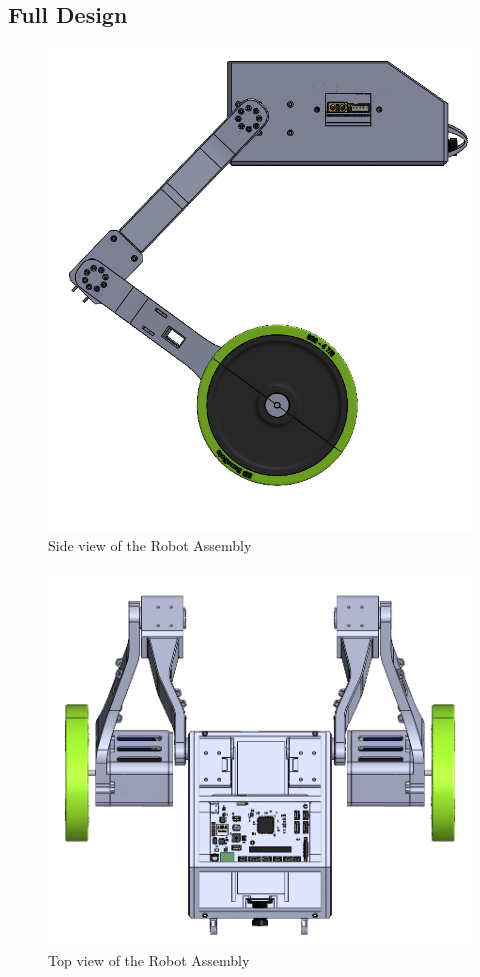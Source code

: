 \newpage
\subsection{Full Design}


\begin{figure}[h]
	\centering
	\includegraphics[width=.6\linewidth]{Robot_Assembly_1}
	\caption[Side view of the Robot Assembly]{Side view of the Robot Assembly}
	\label{fig:robotassembly1}
\end{figure}
\begin{figure}[h]
	\centering
	\includegraphics[width=.6\linewidth]{Robot_Assembly_2}
	\caption[Top view of the Robot Assembly]{Top view of the Robot Assembly}
	\label{fig:robotassembly2}
\end{figure}
